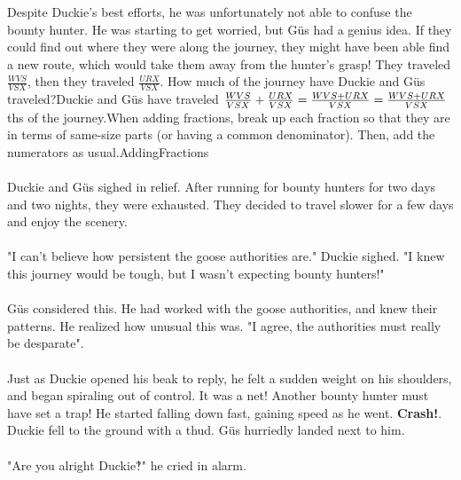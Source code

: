 {Despite Duckie's best efforts, he was unfortunately not able to confuse the bounty hunter. He was starting to get worried, but Güs had a genius idea. If they could find out where they were along the journey, they might have been able find a new route, which would take them away from the hunter's grasp! They traveled $\frac{WVS}{VSX}$, then they traveled $\frac{URX}{VSX}$. How much of the journey have Duckie and Güs traveled?}{Duckie and Güs have traveled
$\frac{WVS}{VSX}+\frac{URX}{VSX}\linebreak=\frac{WVS+URX}{VSX}\linebreak=\frac{WVS+URX}{VSX}$ths of the journey.}{When adding fractions, break up each fraction so that they are in terms of same-size parts (or having a common denominator). Then, add the numerators as usual.}{AddingFractions}
\paragraph{} Duckie and Güs sighed in relief. After running for bounty hunters for two days and two nights, they were exhausted. They decided to travel slower for a few days and enjoy the scenery. 
\paragraph{} "I can't believe how persistent the goose authorities are." Duckie sighed. "I knew this journey would be tough, but I wasn't expecting bounty hunters!"
\paragraph{} Güs considered this. He had worked with the goose authorities, and knew their patterns. He realized how unusual this was. "I agree, the authorities must really be desparate".
\paragraph{} Just as Duckie opened his beak to reply, he felt a sudden weight on his shoulders, and began spiraling out of control. It was a net! Another bounty hunter must have set a trap! He started falling down fast, gaining speed as he went. \textbf{Crash!}. Duckie fell to the ground with a thud. Güs hurriedly landed next to him. 
\paragraph{} "Are you alright Duckie‽" he cried in alarm.
